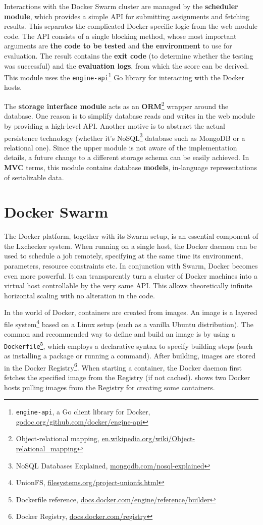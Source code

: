 Interactions with the Docker Swarm cluster are managed by the \textbf{scheduler module}, which provides a simple API for submitting assignments and fetching results. This separates the complicated Docker-specific logic from the web module code. The API consists of a single blocking method, whose most important arguments are \textbf{the code to be tested} and \textbf{the environment} to use for evaluation. The result contains the \textbf{exit code} (to determine whether the testing was successful) and the \textbf{evaluation logs}, from which the score can be derived. This module uses the \texttt{engine-api}\footnote{\texttt{engine-api}, a Go client library for Docker, \url{godoc.org/github.com/docker/engine-api}} Go library for interacting with the Docker hosts.

The \textbf{storage interface module} acts as an \textbf{ORM}\footnote{Object-relational mapping, \url{en.wikipedia.org/wiki/Object-relational_mapping}} wrapper around the database. One reason is to simplify database reads and writes in the web module by providing a high-level API. Another motive is to abstract the actual persistence technology (whether it's NoSQL\footnote{NoSQL Databases Explained, \url{mongodb.com/nosql-explained}} database such as MongoDB or a relational one). Since the upper module is not aware of the implementation details, a future change to a different storage schema can be easily achieved. In \textbf{MVC} terms, this module contains database \textbf{models}, in-language representations of serializable data.


\section{Docker Swarm}
\label{sec:swarm}

The Docker platform, together with its Swarm setup, is an essential component of the Lxchecker system. When running on a single host, the Docker daemon can be used to schedule a job remotely, specifying at the same time its environment, parameters, resource constraints etc. In conjunction with Swarm, Docker becomes even more powerful. It can transparently turn a cluster of Docker machines into a virtual host controllable by the very same API. This allows theoretically infinite horizontal scaling with no alteration in the code.

In the world of Docker, containers are created from images. An image is a layered file system\footnote{UnionFS, \url{filesystems.org/project-unionfs.html}} based on a Linux setup (such as a vanilla Ubuntu distribution). The common and recommended way to define and build an image is by using a \texttt{Dockerfile}\footnote{Dockerfile reference, \url{docs.docker.com/engine/reference/builder}}, which employs a declarative syntax to specify building steps (such as installing a package or running a command). After building, images are stored in the Docker Registry\footnote{Docker Registry, \url{docs.docker.com/registry}}. When starting a container, the Docker daemon first fetches the specified image from the Registry (if not cached).  shows two Docker hosts pulling images from the Registry for creating some containers.

